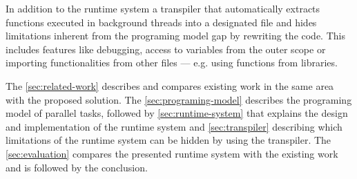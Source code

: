 In addition to the runtime system a transpiler that automatically extracts functions executed in background threads into a designated file and hides limitations inherent from the programing model gap by rewriting the code. This includes features like debugging, access to variables from the outer scope or importing functionalities from other files --- e.g. using functions from libraries.

The \cref{sec:related-work} describes and compares existing work in the same area with the proposed solution. The \cref{sec:programing-model} describes the programing model of parallel tasks, followed by \cref{sec:runtime-system} that explains the design and implementation of the runtime system and \cref{sec:transpiler} describing which limitations of the runtime system can be hidden by using the transpiler. The \cref{sec:evaluation} compares the presented runtime system with the existing work and is followed by the conclusion. 